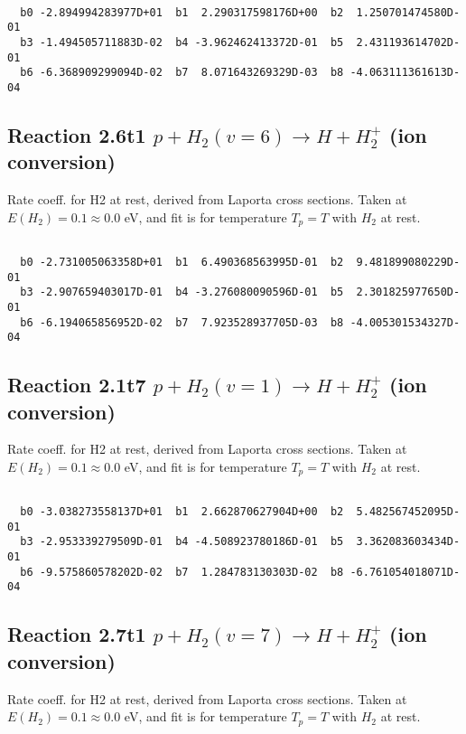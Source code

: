 \begin{small}\begin{verbatim}

  b0 -2.894994283977D+01  b1  2.290317598176D+00  b2  1.250701474580D-01
  b3 -1.494505711883D-02  b4 -3.962462413372D-01  b5  2.431193614702D-01
  b6 -6.368909299094D-02  b7  8.071643269329D-03  b8 -4.063111361613D-04

\end{verbatim}\end{small}

\newpage
\subsection{
Reaction 2.6t1
$ p + H_2(v=6) \rightarrow H + H_2^+$ (ion conversion)
}
Rate coeff. for H2 at rest, derived from Laporta cross sections.
Taken at $E(H_2) = 0.1 \approx 0.0$ eV,  and fit is for temperature $T_p=T$ with $H_2$ at rest.

\begin{small}\begin{verbatim}

  b0 -2.731005063358D+01  b1  6.490368563995D-01  b2  9.481899080229D-01
  b3 -2.907659403017D-01  b4 -3.276080090596D-01  b5  2.301825977650D-01
  b6 -6.194065856952D-02  b7  7.923528937705D-03  b8 -4.005301534327D-04

\end{verbatim}\end{small}

\newpage
\subsection{
Reaction 2.1t7
$ p + H_2(v=1) \rightarrow H + H_2^+$ (ion conversion)
}
Rate coeff. for H2 at rest, derived from Laporta cross sections.
Taken at $E(H_2) = 0.1 \approx 0.0$ eV,  and fit is for temperature $T_p=T$ with $H_2$ at rest.

\begin{small}\begin{verbatim}

  b0 -3.038273558137D+01  b1  2.662870627904D+00  b2  5.482567452095D-01
  b3 -2.953339279509D-01  b4 -4.508923780186D-01  b5  3.362083603434D-01
  b6 -9.575860578202D-02  b7  1.284783130303D-02  b8 -6.761054018071D-04

\end{verbatim}\end{small}

\newpage
\subsection{
Reaction 2.7t1
$ p + H_2(v=7) \rightarrow H + H_2^+$ (ion conversion)
}
Rate coeff. for H2 at rest, derived from Laporta cross sections.
Taken at $E(H_2) = 0.1 \approx 0.0$ eV,  and fit is for temperature $T_p=T$ with $H_2$ at rest.

